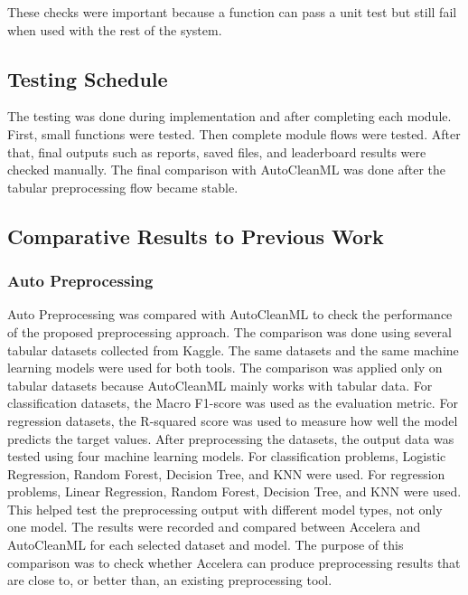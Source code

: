 \documentclass[12pt,a4paper]{report}
\begin{document}
These checks were important because a function can pass a unit test but still
fail when used with the rest of the system.

\subsection{Testing Schedule}

The testing was done during implementation and after completing each module.
First, small functions were tested. Then complete module flows were tested.
After that, final outputs such as reports, saved files, and leaderboard results
were checked manually. The final comparison with AutoCleanML was done after the
tabular preprocessing flow became stable.

\subsection{Comparative Results to Previous Work}
\subsubsection{Auto Preprocessing}
Auto Preprocessing was compared with AutoCleanML to check the performance of the proposed preprocessing approach. The comparison was done using several tabular datasets collected from Kaggle. The same datasets and the same machine learning models were used for both tools.
The comparison was applied only on tabular datasets because AutoCleanML mainly works with tabular data. For classification datasets, the Macro F1-score was used as the evaluation metric. For regression datasets, the R-squared score was used to measure how well the model predicts the target values.
After preprocessing the datasets, the output data was tested using four machine learning models. For classification problems, Logistic Regression, Random Forest, Decision Tree, and KNN were used. For regression problems, Linear Regression, Random Forest, Decision Tree, and KNN were used. This helped test the preprocessing output with different model types, not only one model.
The results were recorded and compared between Accelera and AutoCleanML for each selected dataset and model. The purpose of this comparison was to check whether Accelera can produce preprocessing results that are close to, or better than, an existing preprocessing tool.
\end{document}
